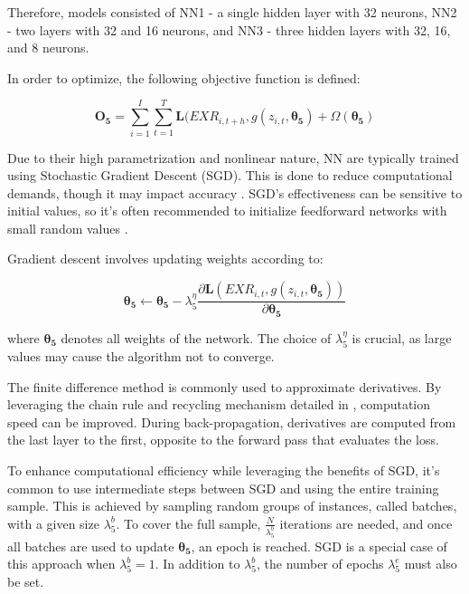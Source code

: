 \documentclass[preprint,12pt,authoryear]{elsarticle}
\begin{document}
Therefore, models consisted of NN1 - a single hidden layer with 32 neurons, NN2 - two layers with 32 and 16 neurons, and NN3 - three hidden layers with 32, 16, and 8 neurons.

In order to optimize, the following objective function is defined:

\begin{equation}
\label{objnn}
\mathbf{O_{5}} = 
\sum_{i=1}^{I}\sum_{t=1}^{T}\mathbf{L}(EXR_{i,t+h}, g(z_{i,t}, \mathbf{\theta_{5}}) + \Omega(\mathbf{\theta_{5}})    
\end{equation}

Due to their high parametrization and nonlinear nature, NN are typically trained using Stochastic Gradient Descent (SGD). This is done to reduce computational demands, though it may impact accuracy \citep{bottoubousquet2012}. SGD's effectiveness can be sensitive to initial values, so it's often recommended to initialize feedforward networks with small random values \citep{Goodfellow-et-al-2016}.


Gradient descent involves updating weights according to:

\begin{equation}
\mathbf{\theta_{5}} \leftarrow \mathbf{\theta_{5}} - \lambda^{\eta}_{5}\frac{\partial{\mathbf{L}(EXR_{i,t}, g(z_{i,t}, \mathbf{\theta_{5}}))}}{\partial{\mathbf{\theta_{5}}}}
\end{equation}

where $\mathbf{\theta_{5}}$ denotes all weights of the network. The choice of $\lambda^{\eta}_{5}$ is crucial, as large values may cause the algorithm not to converge.

The finite difference method is commonly used to approximate derivatives. By leveraging the chain rule and recycling mechanism detailed in \citet{coqueretguida2020}, computation speed can be improved. During back-propagation, derivatives are computed from the last layer to the first, opposite to the forward pass that evaluates the loss. 


To enhance computational efficiency while leveraging the benefits of SGD, it's common to use intermediate steps between SGD and using the entire training sample. This is achieved by sampling random groups of instances, called batches, with a given size $ \lambda^{b}_{5} $. To cover the full sample, $ \frac{N}{\lambda^{b}_{5}} $ iterations are needed, and once all batches are used to update $ \mathbf{\theta_{5}} $, an epoch is reached. SGD is a special case of this approach when $ \lambda^{b}_{5} = 1 $. In addition to $ \lambda^{b}_{5} $, the number of epochs $ \lambda^{e}_{5} $ must also be set.
\end{document}
